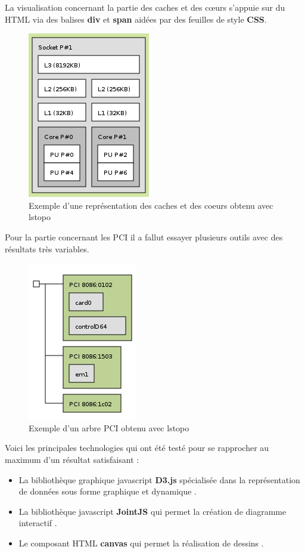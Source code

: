 \documentclass [a4paper,11pt]{article}
\begin{document}
La visualisation concernant la partie des caches et des cœurs s’appuie sur du HTML via des balises \textbf{div} et \textbf{span} aidées par des feuilles de style \textbf{CSS}.

\begin{figure}[!h]
\centering
\includegraphics[scale=0.5]{img/caches.png}
\caption[Résultats]{Exemple d'une représentation des caches et des coeurs obtenu avec lstopo}
\end{figure}

Pour la partie concernant les PCI il a fallut essayer plusieurs outils avec des résultats très variables. 

\begin{figure}[!h]
\centering
\includegraphics[scale=0.5]{img/treePCI.png}
\caption[Résultats]{Exemple d'un arbre PCI obtenu avec lstopo}
\end{figure}

Voici les principales technologies qui ont été testé pour se rapprocher au maximum d’un résultat satisfaisant :
\newline

\begin{itemize}
 \item La bibliothèque graphique javascript \textbf{D3.js} spécialisée dans la représentation de données sous forme graphique et dynamique \cite{d3}.
 \item La bibliothèque javascript \textbf{JointJS} qui permet la création de diagramme interactif \cite{jointjs}.
 \item Le composant HTML \textbf{canvas} qui permet la réalisation de dessins \cite{canvas}.
 \newline
\end{itemize}
\end{document}

